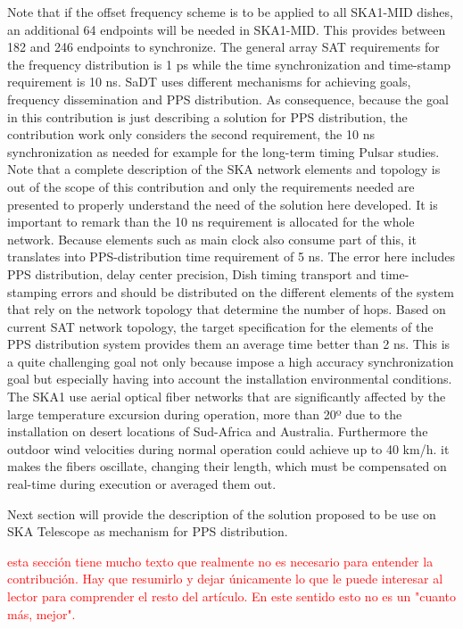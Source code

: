 Note that if the offset frequency scheme is to be applied to all SKA1-MID dishes, an additional 64 endpoints will be needed in SKA1-MID. This provides between 182 and 246 endpoints to synchronize. 
The general array SAT requirements for the frequency distribution is 1 ps while the time synchronization and time-stamp requirement is 10 ns. SaDT uses different mechanisms for achieving goals, frequency dissemination and PPS distribution. As consequence, because the goal in this contribution is just describing a solution for PPS distribution, the contribution work only considers the second requirement, the 10 ns synchronization as needed for example for the long-term timing Pulsar studies. Note that a complete description of the SKA network elements and topology is out of the scope of this contribution and only the requirements needed are presented to properly understand the need of the solution here developed. 
It is important to remark than the 10 ns requirement is allocated for the whole 
network. Because elements such as main clock also consume part of this, it 
translates into PPS-distribution time requirement of 5 ns. The error here 
includes PPS distribution, delay center precision, Dish timing transport and 
time-stamping errors and should be distributed on the different elements of the 
system that rely on the network topology that determine the number of hops. 
Based on current SAT network topology, the target specification for the 
elements of the PPS distribution system provides them an average time better 
than 2 ns. This is a quite challenging goal not only because impose a high 
accuracy synchronization goal but especially having into account the 
installation environmental conditions. The SKA1 use aerial optical fiber 
networks that are significantly affected by the large temperature excursion 
during operation, more than 20º due to the installation on desert locations of 
Sud-Africa and Australia. Furthermore the outdoor wind velocities during normal 
operation could achieve up to 40 km/h. it makes the fibers oscillate, changing 
their length, which must be compensated on real-time during execution or 
averaged them out. 

Next section will provide the description of the solution proposed to be use on SKA Telescope as mechanism for PPS distribution. 

\textcolor{red}{esta  sección tiene mucho texto que realmente no es necesario para entender la contribución. Hay que resumirlo y dejar únicamente lo que le puede interesar al lector para comprender el resto del artículo. En este sentido esto no es un "cuanto más, mejor".}

